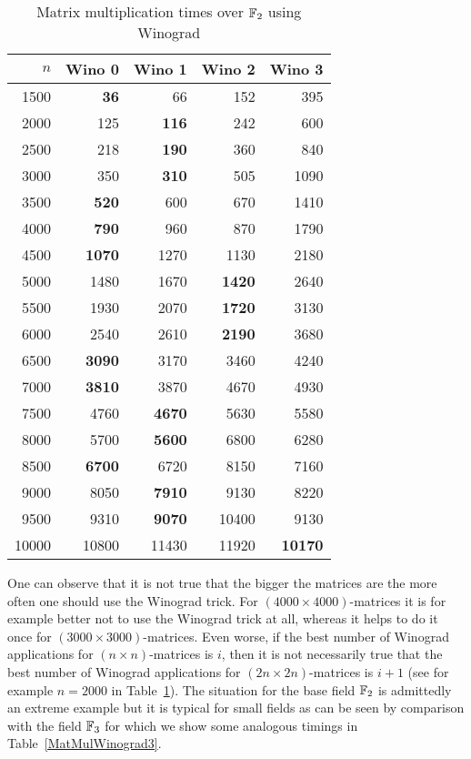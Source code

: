 \begin{table}[ht]
\begin{center}
\begin{tabular}{|r||r|r|r|r|}
\hline
$n$ & Wino 0 & Wino 1 & Wino 2 & Wino 3 \\
\hline
1500 & \textbf{36}     &66   & 152    &395      \\
2000 & 125    &\textbf{116}  & 242    &600      \\
2500 & 218    &\textbf{190}  & 360    &840      \\
3000 & 350    &\textbf{310}  & 505    &1090      \\
3500 & \textbf{520}    &600  & 670    &1410      \\
4000 & \textbf{790}    &960  & 870    &1790      \\
4500 & \textbf{1070}   &1270 & 1130   &2180      \\
5000 & 1480   &1670 & \textbf{1420}   &2640      \\
5500 & 1930   &2070 & \textbf{1720}   &3130      \\
6000 & 2540   &2610 & \textbf{2190}   &3680      \\
6500 & \textbf{3090}   &3170 & 3460   &4240      \\
7000 & \textbf{3810}   &3870 & 4670   &4930      \\
7500 & 4760   &\textbf{4670} & 5630   &5580      \\
8000 & 5700   &\textbf{5600} & 6800   &6280      \\
8500 & \textbf{6700}   &6720 & 8150   &7160      \\
9000 & 8050   &\textbf{7910} & 9130   &8220      \\
9500 & 9310   &\textbf{9070} & 10400  &9130      \\
10000 &10800  &11430&  11920 & \textbf{10170}     \\
\hline
\end{tabular}
\end{center}
\caption{Matrix multiplication times over $\mathbb{F}_2$ using Winograd}
\label{MatMulWinograd2}
%
\end{table}

One can observe that it is not true that the bigger the matrices are
the more often one should use the Winograd trick. For $(4000 \times
4000)$-matrices it is for example better not to use the Winograd trick
at all, whereas it helps to do it once for $(3000 \times
3000)$-matrices. Even worse, if the best number of
Winograd applications for $(n \times n)$-matrices is $i$, then it 
is not necessarily true that the best number of Winograd applications
for $(2n \times 2n)$-matrices is $i+1$ (see for example $n=2000$ in 
Table~\ref{MatMulWinograd2}). The situation for the base field 
$\mathbb{F}_2$ is admittedly an extreme example but it is typical for small
fields as can be seen by comparison with the field $\mathbb{F}_3$ for which we
show some analogous timings in Table~\ref{MatMulWinograd3}.

